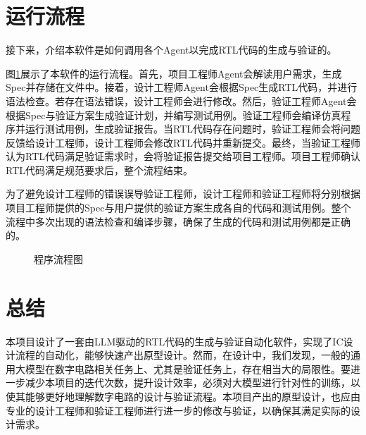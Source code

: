 \documentclass[UTF8]{ctexart}
\begin{document}
\section{运行流程}
接下来，介绍本软件是如何调用各个Agent以完成RTL代码的生成与验证的。

图\ref{fig:flowchart}展示了本软件的运行流程。首先，项目工程师Agent会解读用户需求，生成Spec并存储在文件中。接着，设计工程师Agent会根据Spec生成RTL代码，并进行语法检查。若存在语法错误，设计工程师会进行修改。然后，验证工程师Agent会根据Spec与验证方案生成验证计划，并编写测试用例。验证工程师会编译仿真程序并运行测试用例，生成验证报告。当RTL代码存在问题时，验证工程师会将问题反馈给设计工程师，设计工程师会修改RTL代码并重新提交。最终，当验证工程师认为RTL代码满足验证需求时，会将验证报告提交给项目工程师。项目工程师确认RTL代码满足规范要求后，整个流程结束。

为了避免设计工程师的错误误导验证工程师，设计工程师和验证工程师将分别根据项目工程师提供的Spec与用户提供的验证方案生成各自的代码和测试用例。整个流程中多次出现的语法检查和编译步骤，确保了生成的代码和测试用例都是正确的。


\newpage

\begin{figure}[htbp]
    \centering
    
    \caption{程序流程图}
    \label{fig:flowchart}
\end{figure}
\newpage



\section{总结}
本项目设计了一套由LLM驱动的RTL代码的生成与验证自动化软件，实现了IC设计流程的自动化，能够快速产出原型设计。然而，在设计中，我们发现，一般的通用大模型在数字电路相关任务上、尤其是验证任务上，存在相当大的局限性。要进一步减少本项目的迭代次数，提升设计效率，必须对大模型进行针对性的训练，以使其能够更好地理解数字电路的设计与验证流程。本项目产出的原型设计，也应由专业的设计工程师和验证工程师进行进一步的修改与验证，以确保其满足实际的设计需求。
\end{document}
